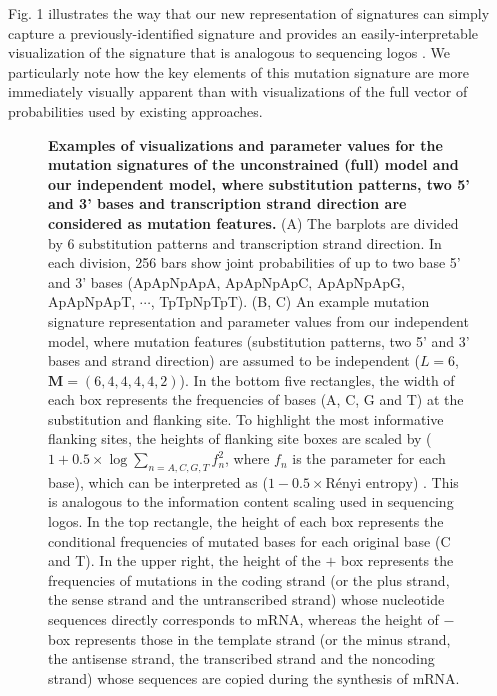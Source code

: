 \documentclass[10pt,letterpaper]{article}
\begin{document}
Fig. 1 illustrates the way that our new representation of signatures can simply capture
a previously-identified signature \cite{pmid25362482, pmid23318258} and provides
an easily-interpretable visualization of the signature 
that is analogous to  sequencing logos \cite{pmid2172928}.
We particularly note how the key elements of this mutation signature are more immediately visually apparent than with visualizations of the full vector of probabilities used by existing approaches.

\begin{figure}[h]

\caption{{\bf Examples of visualizations and parameter values for the mutation signatures of the unconstrained (full) model and our independent model, 
where substitution patterns, two 5' and 3' bases and transcription strand direction are considered as mutation features.}
(A) The barplots are divided by 6 substitution patterns and transcription strand direction.
In each division, 256 bars show joint probabilities of up to two base 5' and 3' bases
(ApApNpApA, ApApNpApC, ApApNpApG, ApApNpApT, $\cdots$, TpTpNpTpT).
(B, C) An example mutation signature representation and parameter values from our independent model, where mutation features (substitution patterns, two 5' and 3' bases and strand direction) 
are assumed to be independent ($L=6$, $\bm{M} = (6, 4, 4, 4, 4, 2)$).
In the bottom five rectangles, the width of each box represents the frequencies of bases (A, C, G and T) at the substitution and flanking site. 
To highlight the most informative flanking sites, the heights of flanking site boxes are scaled by ($1 + 0.5 \times \log \sum_{n = A,C,G,T} f_n^2$, where $f_n$ is the parameter for each base), which can be interpreted as ($1 - 0.5 \times \text{R\'enyi entropy}$) \cite{rrnyi1961measures}. This is analogous to the information content scaling used in sequencing logos.
In the top rectangle, the height of each box represents the conditional frequencies of mutated bases for each original base (C and T).
In the upper right, the height of the $+$ box represents the frequencies of mutations in the coding strand (or the plus strand, the sense strand and the untranscribed strand)
whose nucleotide sequences directly corresponds to mRNA, 
whereas the height of $-$ box represents those in the template strand (or the minus strand, the antisense strand, the transcribed strand and the noncoding strand)
whose sequences are copied during the synthesis of mRNA.
}
\label{mutSig_example}

\end{figure}
\end{document}
